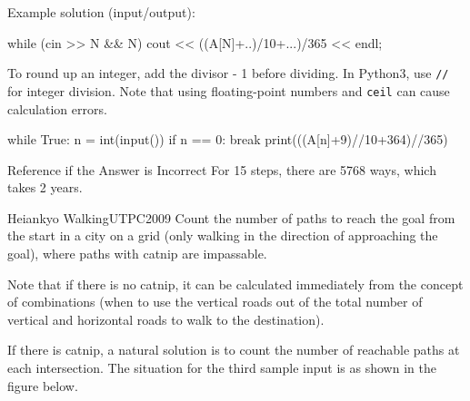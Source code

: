 Example solution (input/output):
\begin{cbox}
    while (cin >> N && N) 
        cout << ((A[N]+..)/10+...)/365 << endl;
\end{cbox}

To round up an integer, add the divisor - 1 before dividing.
In Python3, use \texttt{//} for integer division. Note that using floating-point numbers and \texttt{ceil} can cause calculation errors.

\begin{pybox}
while True:
    n = int(input())
    if n == 0:
        break
    print(((A[n]+9)//10+364)//365)  
\end{pybox}

\begin{debugbox}{Reference if the Answer is Incorrect}
   For 15 steps, there are 5768 ways, which takes 2 years.
\end{debugbox}

\begin{pbox}{Heiankyo Walking}{UTPC2009}
  Count the number of paths to reach the goal from the start in a city on a grid (only walking in the direction of approaching the goal), where paths with catnip are impassable.

\end{pbox}

Note that if there is no catnip, it can be calculated immediately from the concept of combinations (when to use the vertical roads out of the total number of vertical and horizontal roads to walk to the destination).

If there is catnip, a natural solution is to count the number of reachable paths at each intersection. The situation for the third sample input is as shown in the figure below.

